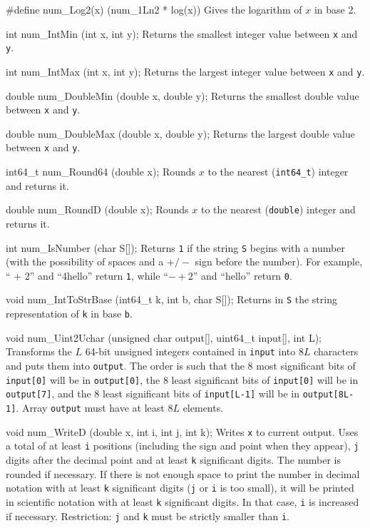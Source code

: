 #define num_Log2(x) (num_1Ln2 * log(x))
\endcode
  \tab Gives the logarithm of $x$ in base 2.
  \endtab
\code

int num_IntMin (int x, int y);
\endcode
  \tab Returns the smallest integer value between {\tt x} and {\tt y}.
  \endtab
\code

int num_IntMax (int x, int y);
\endcode
  \tab Returns the largest integer value between {\tt x} and {\tt y}.
  \endtab
\code

double num_DoubleMin (double x, double y);
\endcode
  \tab Returns the smallest double value between {\tt x} and {\tt y}.
  \endtab
\code

double num_DoubleMax (double x, double y);
\endcode
  \tab Returns the largest double value between {\tt x} and {\tt y}.
  \endtab
\code

int64_t num_Round64 (double x);
\endcode
  \tab Rounds $x$ to the nearest ({\tt int64\_t}) integer and returns it.
  \endtab
\code

double num_RoundD (double x);
\endcode
  \tab Rounds $x$ to the nearest ({\tt double}) integer and returns it.
  \endtab
\code

int num_IsNumber (char S[]);
\endcode
\tab  Returns {\tt 1} if the string {\tt S} begins with a number
   (with the possibility of spaces and a $+/-$ sign
   before the number). For example, `` + 2'' and ``4hello''
   return {\tt 1}, while ``$-+2$'' and ``hello'' return  {\tt 0}.
\endtab
\code

void num_IntToStrBase (int64_t k, int b, char S[]);
\endcode
  \tab Returns in {\tt S} the string representation of {\tt k} in base {\tt b}.
  \endtab
\code

void num_Uint2Uchar (unsigned char output[], uint64_t input[], int L);
\endcode
  \tab Transforms the $L$ 64-bit unsigned integers contained in {\tt input} into
  $8L$ characters and puts them into {\tt output}. The order is such that
  the 8 most significant bits of {\tt input[0]} will be in {\tt output[0]},
  the 8 least significant bits of {\tt input[0]} will be in {\tt output[7]},
  and the 8 least significant bits of {\tt input[L-1]} will be in
  {\tt output[8L-1]}. Array {\tt output} must have at least $8L$ elements.
  \endtab
\code

void num_WriteD (double x, int i, int j, int k);
\endcode
  \tab  Writes {\tt x} to current output.  Uses a total of at least {\tt i}
   positions (including the sign and point when they appear),
   {\tt j} digits after the decimal point and at least {\tt k}
   significant digits.   The number is rounded if necessary.
   If there is not enough space to print the number in decimal notation
   with at least {\tt k} significant digits
   ({\tt j} or {\tt i} is too small), it will be printed in scientific
   notation with at least {\tt k} significant digits.
   In that case, {\tt i} is increased if necessary.
   Restriction: {\tt j} and {\tt k} must be strictly smaller than {\tt i}.
 \endtab
\code

